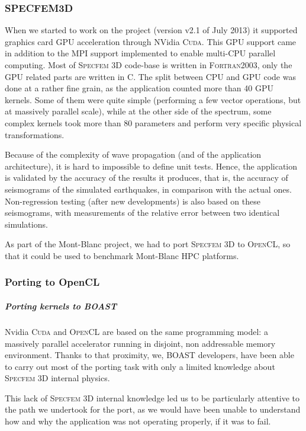 \documentclass[11pt, a4paper, twoside]{montblanc}
\newcommand{\productname}[1]{\textsc{#1}}
\newcommand{\Specfem}{\productname{Specfem 3D}\xspace}
\newcommand{\Cuda}{\productname{Cuda}\xspace}
\newcommand{\OCL}{\productname{OpenCL}\xspace}
\begin{document}
    \subsubsection{SPECFEM3D}

When we started to work on the project (version v2.1 of July 2013) it
supported graphics card GPU acceleration through NVidia \Cuda. This
GPU support came in addition to the MPI support implemented to enable
multi-CPU parallel computing. Most of \Specfem code-base is written in
\productname{Fortran2003}, only the GPU related parts are written in
C.  The split between CPU and GPU code was done at a rather fine
grain, as the application counted more than 40 GPU kernels. Some of
them were quite simple (\eg performing a few vector operations, but at
massively parallel scale), while at the other side of the spectrum,
some complex kernels took more than 80 parameters and perform very
specific physical transformations.

Because of the complexity of wave propagation (and of the application
architecture), it is hard to impossible to define unit tests. Hence,
the application is validated by the accuracy of the results it
produces, that is, the accuracy of seismograms of the simulated
earthquakes, in comparison with the actual ones. Non-regression
testing (after new developments) is also based on these seismograms,
with measurements of the relative error between two identical
simulations.

As part of the Mont-Blanc project, we had to port \Specfem to \OCL, so
that it could be used to benchmark Mont-Blanc HPC platforms.

\subsubsection{Porting to OpenCL}

\subparagraph{Porting kernels to BOAST} 

Nvidia \Cuda and \OCL are based on the same programming model: a
massively parallel accelerator running in disjoint, non addressable
memory environment. Thanks to that proximity, we, BOAST developers,
have been able to carry out most of the porting task with only a
limited knowledge about \Specfem internal physics.

This lack of \Specfem internal knowledge led us to be particularly
attentive to the path we undertook for the port, as we would have
been unable to understand how and why the application was not
operating properly, if it was to fail.
\end{document}
